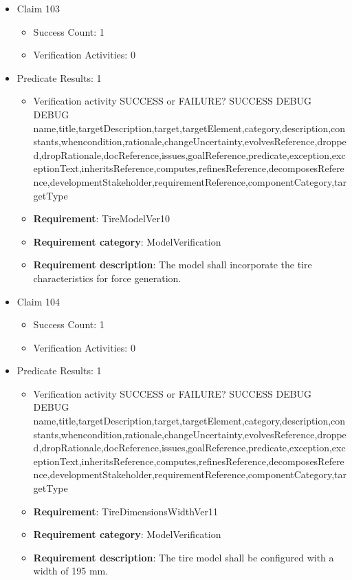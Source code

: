 \documentclass{article}
\begin{document}
\begin{itemize}
  				  \item Claim 103
				\begin{itemize}
			    	\item Success Count: 1 
			    	\item Verification Activities: 0
				\end{itemize}
				
									    
				\item Predicate Results: 1
					\begin{itemize}				
					\item Verification activity SUCCESS or FAILURE? SUCCESS
					DEBUG DEBUG name,title,targetDescription,target,targetElement,category,description,constants,whencondition,rationale,changeUncertainty,evolvesReference,dropped,dropRationale,docReference,issues,goalReference,predicate,exception,exceptionText,inheritsReference,computes,refinesReference,decomposesReference,developmentStakeholder,requirementReference,componentCategory,targetType
					\item \textbf{Requirement}: TireModelVer10 
					\item \textbf{Requirement category}: ModelVerification
					\item \textbf{Requirement description}: The model shall incorporate the tire characteristics for force generation.
					\end{itemize}

  				  \item Claim 104
				\begin{itemize}
			    	\item Success Count: 1 
			    	\item Verification Activities: 0
				\end{itemize}
				
									    
				\item Predicate Results: 1
					\begin{itemize}				
					\item Verification activity SUCCESS or FAILURE? SUCCESS
					DEBUG DEBUG name,title,targetDescription,target,targetElement,category,description,constants,whencondition,rationale,changeUncertainty,evolvesReference,dropped,dropRationale,docReference,issues,goalReference,predicate,exception,exceptionText,inheritsReference,computes,refinesReference,decomposesReference,developmentStakeholder,requirementReference,componentCategory,targetType
					\item \textbf{Requirement}: TireDimensionsWidthVer11 
					\item \textbf{Requirement category}: ModelVerification
					\item \textbf{Requirement description}: The tire model shall be configured with a width of 195 mm.
					\end{itemize}


\end{itemize}
\end{document}
